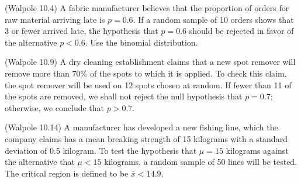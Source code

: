 \documentclass[14pt]{exam}
\begin{document}
\begin{questions}
            \question
		(Walpole 10.4)
A fabric manufacturer believes that the proportion of orders for raw material arriving late is $p = 0.6$. If a random sample of 10 orders shows that 3 or fewer
arrived late, the hypothesis that $p = 0.6$ should be rejected in favor of the alternative $p < 0.6$. Use the binomial distribution.
    
            \question
            (Walpole 10.9)
            A dry cleaning establishment claims that a new spot remover will remove more than $70\% $ of the spots to which it is applied. To check this claim, the spot remover will be used on 12 spots chosen at random. If fewer than 11 of the spots are removed, we shall not reject the null hypothesis that $p = 0.7$; otherwise, we conclude that $p > 0.7$.

            \question
            (Walpole 10.14)
            A manufacturer has developed a new fishing line, which the company claims has a mean breaking strength of 15 kilograms with a standard deviation of 0.5 kilogram. To test the hypothesis that $\mu = 15$ kilograms against the alternative that $\mu < 15$ kilograms, a random sample of 50 lines will be tested. The critical region is defined to be $\overline{x} < 14.9$.
\end{questions}
\end{document}
